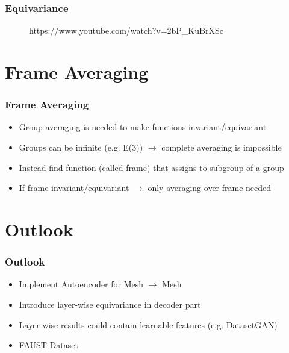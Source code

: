 \documentclass{beamer}
\begin{document}
\begin{frame}
\frametitle{Equivariance}
\begin{figure}[h]
\caption{https://www.youtube.com/watch?v=2bP\_KuBrXSc}
\end{figure}
\end{frame}


\section{Frame Averaging}
\begin{frame}
\frametitle{Frame Averaging}
\begin{itemize}
\item<2-> Group averaging is needed to make functions invariant/equivariant
\bigskip
\item<3-> Groups can be infinite (e.g. E(3)) $\rightarrow$ complete averaging is impossible
\bigskip
\item<4-> Instead find function (called frame) that assigns to subgroup of a group
\bigskip
\item<5-> If frame invariant/equivariant $\rightarrow$ only averaging over frame needed
\end{itemize}
\end{frame}

\section{Outlook}
\begin{frame}
\frametitle{Outlook}
\begin{itemize}
\item<2-> Implement Autoencoder for Mesh $\rightarrow$ Mesh 
\bigskip
\item<3-> Introduce layer-wise equivariance in decoder part
\bigskip
\item<4-> Layer-wise results could contain learnable features (e.g. DatasetGAN)
\bigskip
\item<5-> FAUST Dataset
\end{itemize}
\end{frame}
\end{document}
